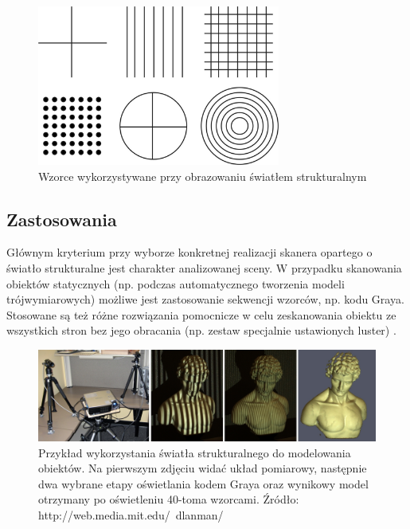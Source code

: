 \begin{figure}[h!]
\centering
\includegraphics[width=8cm]{../../Common/img/struct_patterns}
\caption[Wzorce wykorzystywane przy obrazowaniu światłem strukturalnym]
{Wzorce wykorzystywane przy obrazowaniu światłem strukturalnym}
\label{fig:struct_patterns}
\end{figure}

\subsection{Zastosowania}

Głównym kryterium przy wyborze konkretnej realizacji skanera opartego o światło
strukturalne jest charakter analizowanej sceny. W przypadku skanowania obiektów
statycznych (np. podczas automatycznego tworzenia modeli trójwymiarowych)
możliwe jest zastosowanie sekwencji wzorców, np. kodu Graya. Stosowane są też
różne rozwiązania pomocnicze w celu zeskanowania obiektu ze wszystkich stron bez
jego obracania (np. zestaw specjalnie ustawionych luster) \cite{LanmanCT07}.

\begin{figure}[!ht]
\centering
\includegraphics[width=14cm]{../../Common/img/struct_all}
\caption[Przykład wykorzystania światła strukturalnego do modelowania obiektów]
{Przykład wykorzystania światła strukturalnego do modelowania obiektów. Na
pierwszym zdjęciu widać układ pomiarowy, następnie dwa wybrane etapy oświetlania
kodem Graya oraz wynikowy model otrzymany po oświetleniu 40-toma wzorcami.
Źródło: http://web.media.mit.edu/~dlanman/}
\label{fig:struct_all}
\end{figure}

